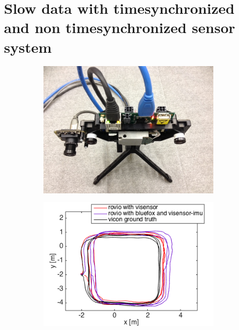 \chapter{Slow data with timesynchronized and non timesynchronized sensor system}\label{sec:appendix_slow}

\begin{figure}[h]
  \begin{subfigure}[b]{0.42\textwidth}
    \includegraphics[width=\textwidth]{images/vi_bluefox.JPG}
    \caption{}
  \end{subfigure}
  \hfill
  \begin{subfigure}[b]{0.42\textwidth}
    \includegraphics[width=\textwidth]{images/slow_2D.png}
    \caption{}
  \end{subfigure}

\end{figure}

